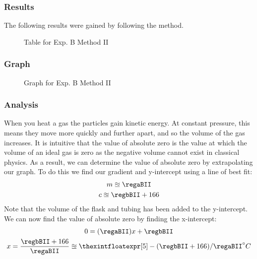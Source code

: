 \subsubsection{Results}
The following results were gained by following the method.
\begin{figure}[H]
  \caption{Table for Exp. B Method II}
\end{figure}

\subsubsection{Graph}
\begin{figure}[H]
  \centering
  \caption{Graph for Exp. B Method II}
\end{figure}

\subsubsection{Analysis}
When you heat a gas the particles gain kinetic energy.
At constant pressure, this means they move more quickly and further apart, and so the volume of the gas increases.
It is intuitive that the value of absolute zero is the value at which the volume of an ideal gas is zero as the negative volume cannot exist in classical physics.
As a result, we can determine the value of absolute zero by extrapolating our graph.
To do this we find our gradient and y-intercept using a line of best fit:
\begin{gather*}
    m \approxeq \regaBII \\
    c \approxeq \regbBII + 166
\end{gather*}
Note that the volume of the flask and tubing has been added to the y-intercept. We can now find the value of absolute zero by finding the x-intercept:
\begin{gather*}
  0 =  (\regaBII)x+\regbBII \\
  x = \frac{\regbBII + 166}{\regaBII} \approxeq {\thexintfloatexpr [5] -(\regbBII+166)/\regaBII \relax} ^\circ C
\end{gather*}

